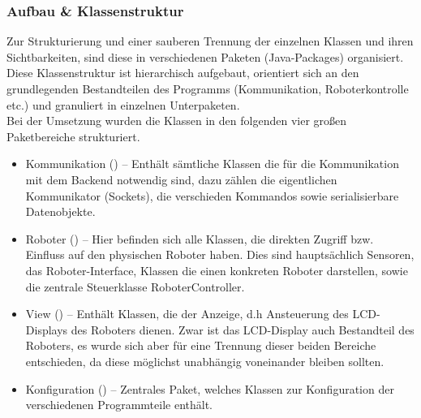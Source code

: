\subsubsection{Aufbau \& Klassenstruktur}
Zur Strukturierung und einer sauberen Trennung der einzelnen Klassen und ihren Sichtbarkeiten, sind diese in verschiedenen 
Paketen (Java-Packages) organisiert. Diese Klassenstruktur ist hierarchisch aufgebaut, orientiert sich an den grundlegenden 
Bestandteilen des Programms (Kommunikation, Roboterkontrolle etc.) und granuliert in einzelnen Unterpaketen.\\
Bei der Umsetzung wurden die Klassen in den folgenden vier großen Paketbereiche strukturiert.
\begin{itemize}
	\item{Kommunikation ()} -- Enthält sämtliche Klassen die für die Kommunikation mit dem
	Backend notwendig sind, dazu zählen die eigentlichen Kommunikator (Sockets), die verschieden Kommandos sowie serialisierbare 
	Datenobjekte.
	\item{Roboter ()} -- Hier befinden sich alle Klassen, die direkten Zugriff bzw. Einfluss auf den 
	physischen Roboter haben. Dies sind hauptsächlich Sensoren, das Roboter-Interface, Klassen die einen konkreten Roboter darstellen, 
	sowie die zentrale Steuerklasse RoboterController.
	\item{View ()} -- Enthält Klassen, die der Anzeige, d.h Ansteuerung des LCD-Displays des
	Roboters dienen. Zwar ist das LCD-Display auch Bestandteil des Roboters, es wurde sich aber für eine Trennung dieser beiden 
	Bereiche entschieden, da diese möglichst unabhängig voneinander bleiben sollten.
	\item{Konfiguration ()} -- Zentrales Paket, welches Klassen zur Konfiguration 
	der verschiedenen Programmteile enthält.
\end{itemize}
